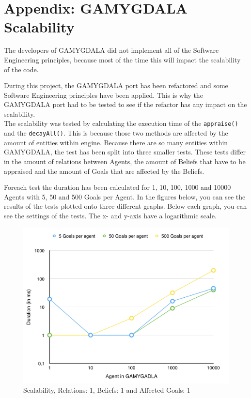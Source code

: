 \section{Appendix: GAMYGDALA Scalability}
The developers of GAMYGDALA did not implement all of the Software Engineering principles, because most of the time this will impact the scalability of the code. \par
During this project, the GAMYGDALA port has been refactored and some Software Engineering principles have been applied. This is why the GAMYGDALA port had to be tested to see if the refactor has any impact on the scalability. \\

The scalability was tested by calculating the execution time of the \texttt{appraise()} and the \texttt{decayAll()}. This is because those two methods are affected by the amount of entities within engine. Because there are so many entities within GAMYGDALA, the test has been split into three smaller tests. These tests differ in the amount of relations between Agents, the amount of Beliefs that have to be appraised and the amount of Goals that are affected by the Beliefs. \par
Foreach test the duration has been calculated for 1, 10, 100, 1000 and 10000 Agents with 5, 50 and 500 Goals per Agent. In the figures below, you can see the results of the tests plotted onto three different graphs. Below each graph, you can see the settings of the tests. The x- and y-axis have a logarithmic scale.

\begin{figure}[H]
  \centering
  \includegraphics[scale=0.5]{scalability/1.jpg}
  \caption{Scalability, Relations: 1, Beliefs: 1 and Affected Goals: 1}
  \label{scala:first}
\end{figure}

